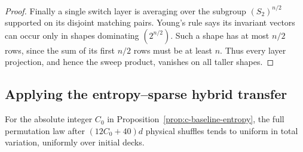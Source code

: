 \begin{proof}
Finally a single switch layer is averaging over the subgroup
$(S_2)^{n/2}$ supported on its disjoint matching pairs.  Young's rule
says its invariant vectors can occur only in shapes dominating
$(2^{n/2})$.  Such a shape has at most $n/2$ rows, since the sum of its
first $n/2$ rows must be at least $n$.  Thus every layer projection,
and hence the sweep product, vanishes on all taller shapes.
\end{proof}

\subsection{Applying the entropy--sparse hybrid transfer}

\begin{corollary}
\label{cor:c-baseline-forest-mixing}
For the absolute integer $C_0$ in
Proposition~\ref{prop:c-baseline-entropy}, the full permutation law
after $(12C_0+40)d$ physical shuffles tends to uniform in total
variation, uniformly over initial decks.
\end{corollary}

